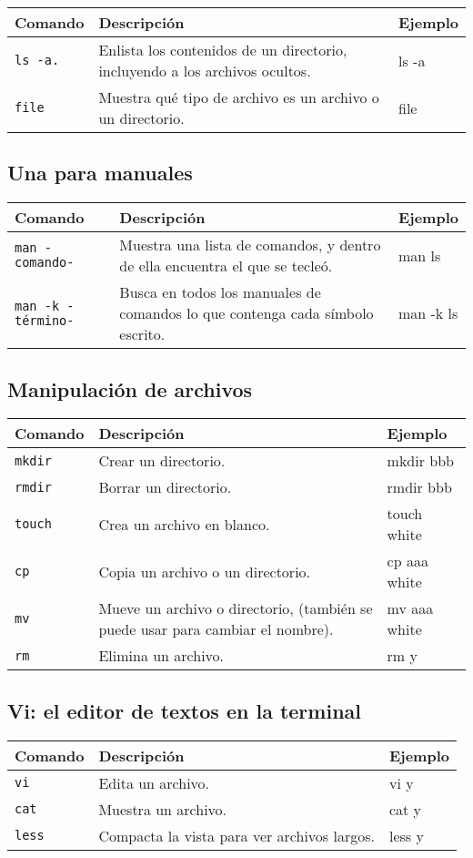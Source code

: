 \documentclass[12pt]{article}
\begin{document}
\begin{tabular}{|p{3cm}|p{10cm}|p{2cm}|}
\hline
Comando & Descripción & Ejemplo \\
\hline
{\tt ls -a.} & Enlista los contenidos de un directorio, incluyendo a los archivos ocultos. & ls -a \\ \hline
{\tt file} & Muestra qué tipo de archivo es un archivo o un directorio. & file \\ \hline
\end{tabular} 

\subsection{Una para manuales}

\begin{tabular}{|p{3cm}|p{10cm}|p{2cm}|}
\hline
Comando & Descripción & Ejemplo \\
\hline
{\tt man -comando-} & Muestra una lista de comandos, y dentro de ella encuentra el que se tecleó. & man ls \\ \hline
{\tt man -k -término-} & Busca en todos los manuales de comandos lo que contenga cada símbolo escrito. & man -k ls \\ \hline
\end{tabular} 

\subsection{Manipulación de archivos}
\begin{tabular}{|p{3cm}|p{10cm}|p{2cm}|}
\hline
Comando & Descripción & Ejemplo \\
\hline
{\tt mkdir} & Crear un directorio. & mkdir bbb \\ \hline
{\tt rmdir} & Borrar un directorio. & rmdir bbb \\ \hline
{\tt touch} & Crea un archivo en blanco. & touch white \\ \hline
{\tt cp} & Copia un archivo o un directorio. & cp aaa white \\ \hline
{\tt mv} & Mueve un archivo o directorio, (también se puede usar para cambiar el nombre). & mv aaa white \\ \hline
{\tt rm} & Elimina un archivo. & rm y \\ \hline
\end{tabular} 

\subsection{Vi: el editor de textos en la terminal}
\begin{tabular}{|p{3cm}|p{10cm}|p{2cm}|}
\hline
Comando & Descripción & Ejemplo \\
\hline
{\tt vi} & Edita un archivo. & vi y \\ \hline
{\tt cat} & Muestra un archivo. & cat y \\ \hline
{\tt less} & Compacta la vista para ver archivos largos. & less y \\ \hline
\end{tabular} 
\end{document}
